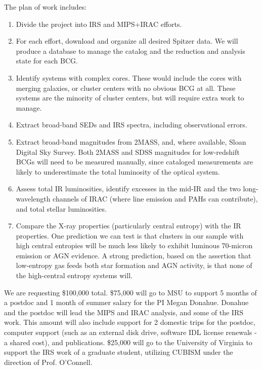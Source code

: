 \documentclass[letterpaper,12pt]{article}
\begin{document}
The plan of work includes:
\begin{enumerate}
\item Divide the project into IRS and MIPS+IRAC efforts.
\item For each effort, download and organize all desired Spitzer data. We will
produce a database to manage the catalog and the reduction and analysis state
for each BCG.
\item Identify systems with complex cores. These would include the cores with merging
galaxies, or cluster centers with no obvious BCG at all. These systems are the minority
of cluster centers, but will require extra work to manage.
\item Extract broad-band SEDs and IRS spectra, including observational errors.
\item Extract broad-band magnitudes from 2MASS, and, where available, Sloan Digital Sky Survey. 
Both 2MASS and SDSS magnitudes for low-redshift BCGs will need to be measured manually, since
cataloged measurements are likely to underestimate the total luminosity of the optical system.
\item Assess total IR luminosities, identify excesses in the mid-IR and the two long-wavelength
channels of IRAC (where line emission and PAHs can contribute), and total stellar luminosities.
\item Compare the X-ray properties (particularly central entropy) with the IR properties. 
One prediction we can test is that clusters in our sample with high central entropies will be much 
less likely to exhibit luminous 70-micron emission or AGN evidence. A strong prediction, based
on the assertion that low-entropy gas feeds both star formation and AGN activity, is that
none of the high-central entropy systems will.
\end{enumerate}

We are requesting \$100,000 total. \$75,000 will go to MSU to support 5 months of a 
postdoc and 1 month of summer salary for the PI Megan Donahue. Donahue and the postdoc
will lead the MIPS and IRAC analysis, and some of the IRS work. This amount will also include
support for 2 domestic trips for the postdoc, computer support (such as an external 
disk drive, software IDL license renewals - a shared cost), and publications.
\$25,000 will go to the University of Virginia to support the IRS work
of a graduate student, utilizing CUBISM under the direction of Prof. O'Connell.
\end{document}
